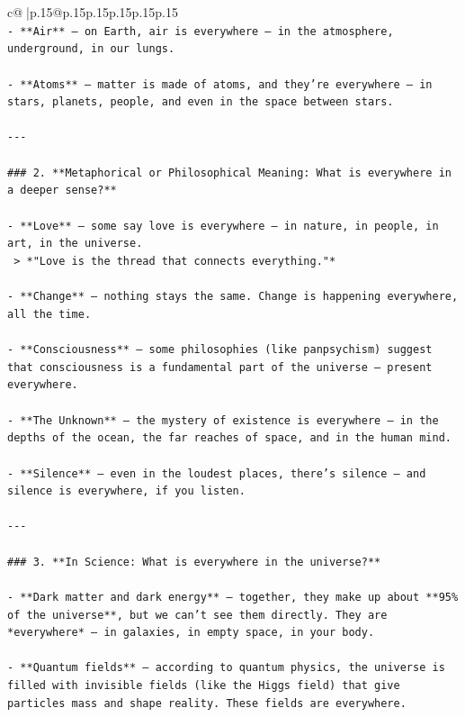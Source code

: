 \documentclass{article}
\begin{document}
{\begin{supertabular}{c@{$\;$}|p{.15\linewidth}@{}p{.15\linewidth}p{.15\linewidth}p{.15\linewidth}p{.15\linewidth}p{.15\linewidth}}
{{{\\ 
\texttt{{-} **Air** — on Earth, air is everywhere — in the atmosphere, underground, in our lungs.} \\
\\ 
\texttt{{-} **Atoms** — matter is made of atoms, and they’re everywhere — in stars, planets, people, and even in the space between stars.} \\
\\ 
\texttt{{-}{-}{-}} \\
\\ 
\texttt{\#\#\# 2. **Metaphorical or Philosophical Meaning: What is everywhere in a deeper sense?**} \\
\\ 
\texttt{{-} **Love** — some say love is everywhere — in nature, in people, in art, in the universe.  } \\
\texttt{  > *"Love is the thread that connects everything."*} \\
\\ 
\texttt{{-} **Change** — nothing stays the same. Change is happening everywhere, all the time.} \\
\\ 
\texttt{{-} **Consciousness** — some philosophies (like panpsychism) suggest that consciousness is a fundamental part of the universe — present everywhere.} \\
\\ 
\texttt{{-} **The Unknown** — the mystery of existence is everywhere — in the depths of the ocean, the far reaches of space, and in the human mind.} \\
\\ 
\texttt{{-} **Silence** — even in the loudest places, there’s silence — and silence is everywhere, if you listen.} \\
\\ 
\texttt{{-}{-}{-}} \\
\\ 
\texttt{\#\#\# 3. **In Science: What is everywhere in the universe?**} \\
\\ 
\texttt{{-} **Dark matter and dark energy** — together, they make up about **95\% of the universe**, but we can’t see them directly. They are *everywhere* — in galaxies, in empty space, in your body.} \\
\\ 
\texttt{{-} **Quantum fields** — according to quantum physics, the universe is filled with invisible fields (like the Higgs field) that give particles mass and shape reality. These fields are everywhere.} \\
}}}
\end{supertabular}}
\end{document}
